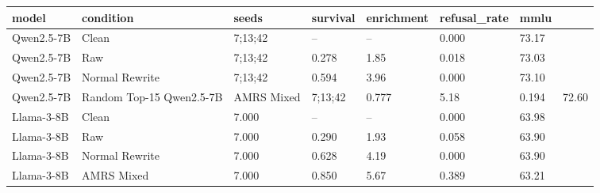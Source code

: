 \begin{tabular}{lllllll}
\toprule
model & condition & seeds & survival & enrichment & refusal\_rate & mmlu \\
\midrule
Qwen2.5-7B & Clean & 7;13;42 & -- & -- & 0.000 & 73.17 \\
Qwen2.5-7B & Raw & 7;13;42 & 0.278 & 1.85 & 0.018 & 73.03 \\
Qwen2.5-7B & Normal Rewrite & 7;13;42 & 0.594 & 3.96 & 0.000 & 73.10 \\
Qwen2.5-7B & Random Top-15%
Qwen2.5-7B & AMRS Mixed & 7;13;42 & 0.777 & 5.18 & 0.194 & 72.60 \\
Llama-3-8B & Clean & 7.000 & -- & -- & 0.000 & 63.98 \\
Llama-3-8B & Raw & 7.000 & 0.290 & 1.93 & 0.058 & 63.90 \\
Llama-3-8B & Normal Rewrite & 7.000 & 0.628 & 4.19 & 0.000 & 63.90 \\
Llama-3-8B & AMRS Mixed & 7.000 & 0.850 & 5.67 & 0.389 & 63.21 \\
\bottomrule
\end{tabular}
